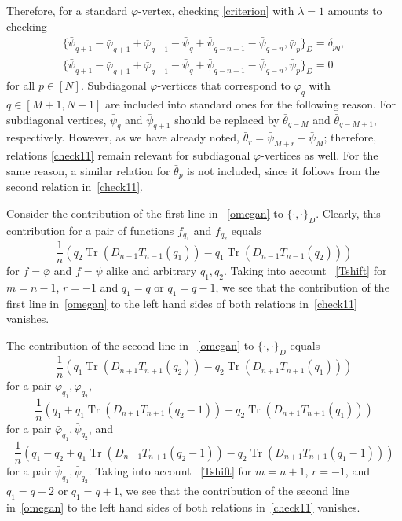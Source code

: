 \documentclass{amsart}
\theoremstyle{definition}
\theoremstyle{remark}
\numberwithin{equation}{section}
\numberwithin{theorem}{section}
\begin{document}
Therefore, for a standard ${{\varphi}}$-vertex, checking \eqref{criterion} with $\lambda=1$ amounts to checking
\begin{equation}\label{check11}
\begin{gathered}
 \{\bar{{\psi}}_{q+1}-\bar{{\varphi}}_{q+1}+\bar{{\varphi}}_{q-1}-\bar{{\psi}}_q+\bar{{\psi}}_{q-n+1}-\bar{{\psi}}_{q-n},
 \bar{{\varphi}}_p\}_D=\delta_{pq},\\
 \{\bar{{\psi}}_{q+1}-\bar{{\varphi}}_{q+1}+\bar{{\varphi}}_{q-1}-\bar{{\psi}}_q+\bar{{\psi}}_{q-n+1}-\bar{{\psi}}_{q-n},
  \bar{{\psi}}_p\}_D=0
\end{gathered}
\end{equation}
for all $p\in [N]$.
Subdiagonal ${{\varphi}}$-vertices
that correspond to ${{\varphi}}_q$ with $q\in [M+1,N-1]$ are included into standard ones
for the following reason. For subdiagonal vertices, $\bar{{\psi}}_q$ and $\bar{{\psi}}_{q+1}$ should be replaced
by $\bar{{\theta}}_{q-M}$ and $\bar{{\theta}}_{q-M+1}$, respectively. However, as we have already noted,   
$\bar{{\theta}}_r=\bar{{\psi}}_{M+r}-\bar{{\psi}}_M$;
therefore, relations \eqref{check11} remain relevant for subdiagonal ${{\varphi}}$-vertices as well.
For the same reason, a similar relation for $\bar{{\theta}}_p$ is not included, since it follows from
the second relation in~\eqref{check11}.

Consider the contribution of the first line in ~\eqref{omegan} to ${{\{\cdot,\cdot\}}}_D$. Clearly, this contribution for a
pair of functions $f_{q_1}$ and $f_{q_2}$ equals
\begin{equation*}\label{line1}
\frac 1n \left(q_2{\operatorname{Tr}}(D_{n-1}T_{n-1}(q_1))-q_1{\operatorname{Tr}}(D_{n-1}T_{n-1}(q_2))\right)
\end{equation*}
for $f=\bar{{\varphi}}$ and $f=\bar{{\psi}}$ alike and arbitrary $q_1, q_2$. Taking into account ~\eqref{Tshift} for 
$m=n-1$, $r=-1$ and $q_1=q$ or $q_1=q-1$,
we see that the contribution of the first line in~\eqref{omegan} to the left hand sides of both relations
in~\eqref{check11} vanishes.

The contribution of the second line in ~\eqref{omegan} to ${{\{\cdot,\cdot\}}}_D$ equals
$$
\frac 1n \left(q_1{\operatorname{Tr}}(D_{n+1}T_{n+1}(q_2))-q_2{\operatorname{Tr}}(D_{n+1}T_{n+1}(q_1))\right)
$$
for a pair $\bar{{\varphi}}_{q_1}, \bar{{\varphi}}_{q_2}$,
$$
\frac 1n \left(q_1+q_1{\operatorname{Tr}}(D_{n+1}T_{n+1}(q_2-1))-q_2{\operatorname{Tr}}(D_{n+1}T_{n+1}(q_1))\right)
$$
for a pair $\bar{{\varphi}}_{q_1}, \bar{{\psi}}_{q_2}$, and
$$
\frac 1n \left(q_1-q_2+q_1{\operatorname{Tr}}(D_{n+1}T_{n+1}(q_2-1))-q_2{\operatorname{Tr}}(D_{n+1}T_{n+1}(q_1-1))\right)
$$
for a pair $\bar{{\psi}}_{q_1}, \bar{{\psi}}_{q_2}$. Taking into account ~\eqref{Tshift} for $m=n+1$, $r=-1$,
and $q_1=q+2$ or $q_1=q+1$,
we see that the contribution of the second line in~\eqref{omegan} to the left hand sides of both relations
in~\eqref{check11} vanishes.
\end{document}

